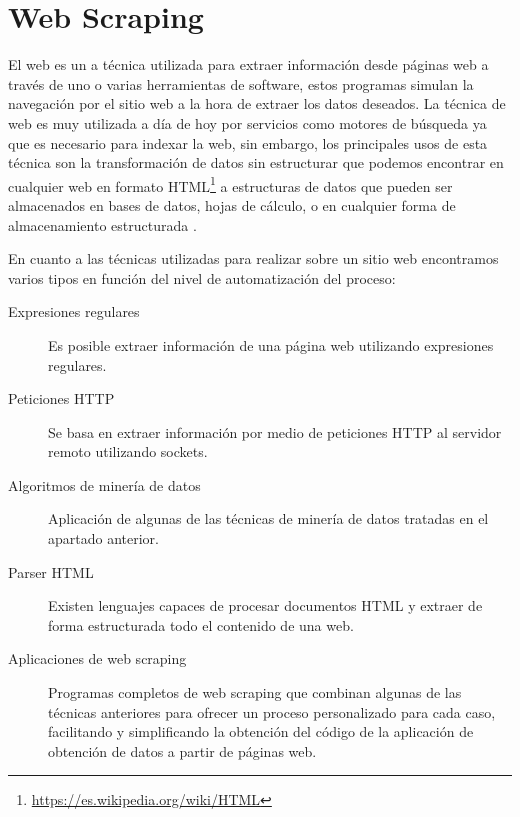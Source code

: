 \section{Web Scraping}
El web  es un a técnica utilizada para extraer información desde páginas web a través de uno o varias herramientas de software, estos programas simulan la navegación por el sitio web a la hora de extraer los datos deseados. La técnica de web  es muy utilizada a día de hoy por servicios como motores de búsqueda ya que es necesario para indexar la web, sin embargo, los principales usos de esta técnica son la transformación de datos sin estructurar que podemos encontrar en cualquier web en formato HTML\footnote{\url{https://es.wikipedia.org/wiki/HTML}} a estructuras de datos que pueden ser almacenados en bases de datos, hojas de cálculo, o en cualquier forma de almacenamiento estructurada \cite{wiki:web_scraping}.

En cuanto a las técnicas utilizadas para realizar  sobre un sitio web encontramos varios tipos en función del nivel de automatización del proceso:

\begin{description}
    \item[Expresiones regulares] Es posible extraer información de una página web utilizando expresiones regulares.
    \item[Peticiones HTTP] Se basa en extraer información por medio de peticiones HTTP al servidor remoto utilizando sockets.
    \item[Algoritmos de minería de datos] Aplicación de algunas de las técnicas de minería de datos tratadas en el apartado anterior.
    \item[Parser HTML] Existen lenguajes capaces de procesar documentos HTML y extraer de forma estructurada todo el contenido de una web.
    \item[Aplicaciones de web scraping] Programas completos de web scraping que combinan algunas de las técnicas anteriores para ofrecer un proceso personalizado para cada caso, facilitando y simplificando la obtención del código de la aplicación de obtención de datos a partir de páginas web.
\end{description}